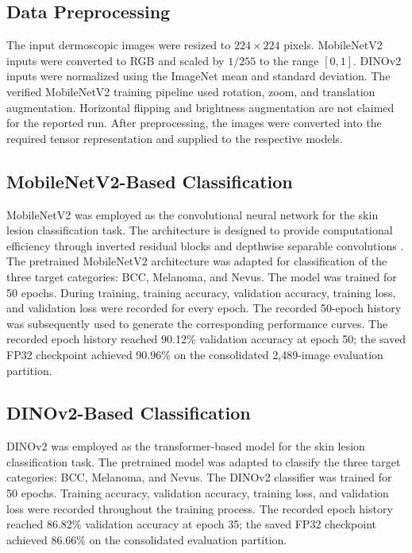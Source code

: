 \documentclass[3p,times,procedia]{elsarticle}
\begin{document}
\subsection{Data Preprocessing}
\label{sec:preprocessing}

The input dermoscopic images were resized to $224\times224$ pixels. MobileNetV2 inputs were converted to RGB and scaled by $1/255$ to the range $[0,1]$. DINOv2 inputs were normalized using the ImageNet mean and standard deviation. The verified MobileNetV2 training pipeline used rotation, zoom, and translation augmentation. Horizontal flipping and brightness augmentation are not claimed for the reported run. After preprocessing, the images were converted into the required tensor representation and supplied to the respective models.

\subsection{MobileNetV2-Based Classification}
\label{sec:mobilenet}

MobileNetV2 was employed as the convolutional neural network for the skin lesion classification task. The architecture is designed to provide computational efficiency through inverted residual blocks and depthwise separable convolutions \cite{sandler2018}. The pretrained MobileNetV2 architecture was adapted for classification of the three target categories: BCC, Melanoma, and Nevus. The model was trained for 50 epochs. During training, training accuracy, validation accuracy, training loss, and validation loss were recorded for every epoch. The recorded 50-epoch history was subsequently used to generate the corresponding performance curves. The recorded epoch history reached 90.12\% validation accuracy at epoch 50; the saved FP32 checkpoint achieved 90.96\% on the consolidated 2,489-image evaluation partition.

\subsection{DINOv2-Based Classification}
\label{sec:dinov2}

DINOv2 was employed as the transformer-based model for the skin lesion classification task. The pretrained model was adapted to classify the three target categories: BCC, Melanoma, and Nevus. The DINOv2 classifier was trained for 50 epochs. Training accuracy, validation accuracy, training loss, and validation loss were recorded throughout the training process. The recorded epoch history reached 86.82\% validation accuracy at epoch 35; the saved FP32 checkpoint achieved 86.66\% on the consolidated evaluation partition.
\end{document}
